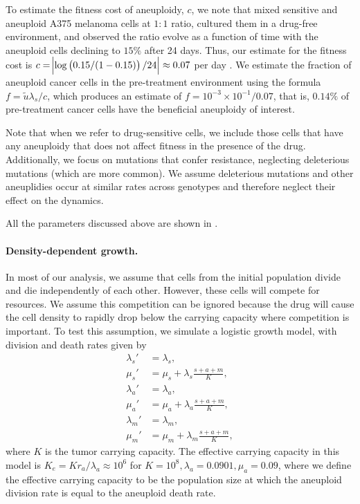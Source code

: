 \documentclass[12pt]{extarticle}
\renewcommand{\Delta}{r}
\begin{document}
To estimate the fitness cost of aneuploidy, $c$, we note that \citet{lukow2021chromosomal} mixed sensitive and aneuploid A375 melanoma cells at $1:1$ ratio, cultured them in a drug-free environment, and observed the ratio evolve as a function of time with the aneuploid cells declining to $15\%$ after 24 days. Thus, our estimate for the fitness cost is $c=\abs{\log\left(0.15/(1-0.15)\right)/24}\approx0.07$ per day \citep{chevin2011measuring}.
We estimate the fraction of aneuploid cancer cells in the pre-treatment environment using the formula $f=\tilde{u}\lambda_s / c$, which produces an estimate of $f=10^{-3}\times10^{-1}/0.07$, that is, $0.14\%$ of pre-treatment cancer cells have the beneficial aneuploidy of interest. %

Note that when we refer to drug-sensitive cells, we include those cells that have any aneuploidy that does not affect fitness in the presence of the drug. Additionally, we focus on mutations that confer resistance, neglecting deleterious mutations (which are more common). We assume deleterious mutations and other aneuplidies occur at similar rates across genotypes and therefore neglect their effect on the dynamics.

All the parameters discussed above are shown in .



\paragraph{Density-dependent growth.}

In most of our analysis, we assume that cells from the initial population divide and die independently of each other. 
However, these cells will compete for resources. 
We assume this competition can be ignored because the drug will cause the cell density to rapidly drop below the carrying capacity where competition is important.
To test this assumption, we simulate a logistic growth model, with division and death rates given by
\[
\begin{aligned}
\lambda_s' &= \lambda_s , \\
\mu_s' &= \mu_s + \lambda_s\frac{s+a+m}{K},\\
\lambda_a' &= \lambda_a ,\\ 
\mu_a' &= \mu_a + \lambda_a\frac{s+a+m}{K} ,\\
\lambda_m' &= \lambda_m ,\\ 
\mu_m' &= \mu_m + \lambda_m\frac{s+a+m}{K} ,
\end{aligned}
\]
where $K$ is the tumor carrying capacity. 
The effective carrying capacity in this model is $K_e=K\Delta_a/\lambda_a\approx10^6$ for $K=10^8, \lambda_a=0.0901,\mu_a=0.09$, where we define the effective carrying capacity to be the population size at which the aneuploid division rate is equal to the aneuploid death rate. 
\end{document}
